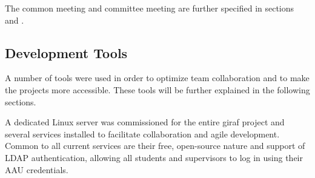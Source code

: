 The common meeting and committee meeting are further specified in sections  and .

\subsection{Development Tools}
\label{sub:devtools}
A number of tools were used in order to optimize team collaboration and to make the projects more accessible. These tools will be further explained in the following sections.

A dedicated Linux server was commissioned for the entire \ac{giraf} project and several services installed to facilitate collaboration and agile development. Common to all current services are their free, open-source nature and support of LDAP authentication, allowing all students and supervisors to log in using their AAU credentials.

